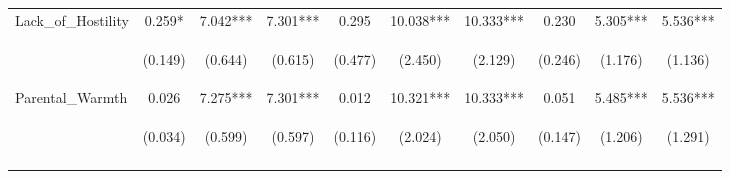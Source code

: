\begin{tabular}{lccccccccc}
\noalign{\smallskip}Lack_of_Hostility & 0.259* & 7.042*** & 7.301*** & 0.295 & 10.038*** & 10.333*** & 0.230 & 5.305*** & 5.536***\\
 & \begin{footnotesize}(0.149)\end{footnotesize} & \begin{footnotesize}(0.644)\end{footnotesize} & \begin{footnotesize}(0.615)\end{footnotesize} & \begin{footnotesize}(0.477)\end{footnotesize} & \begin{footnotesize}(2.450)\end{footnotesize} & \begin{footnotesize}(2.129)\end{footnotesize} & \begin{footnotesize}(0.246)\end{footnotesize} & \begin{footnotesize}(1.176)\end{footnotesize} & \begin{footnotesize}(1.136)\end{footnotesize}\\
\noalign{\smallskip}Parental_Warmth & 0.026 & 7.275*** & 7.301*** & 0.012 & 10.321*** & 10.333*** & 0.051 & 5.485*** & 5.536***\\
 & \begin{footnotesize}(0.034)\end{footnotesize} & \begin{footnotesize}(0.599)\end{footnotesize} & \begin{footnotesize}(0.597)\end{footnotesize} & \begin{footnotesize}(0.116)\end{footnotesize} & \begin{footnotesize}(2.024)\end{footnotesize} & \begin{footnotesize}(2.050)\end{footnotesize} & \begin{footnotesize}(0.147)\end{footnotesize} & \begin{footnotesize}(1.206)\end{footnotesize} & \begin{footnotesize}(1.291)\end{footnotesize}\\
\noalign{\smallskip}\hline\end{tabular}\\
